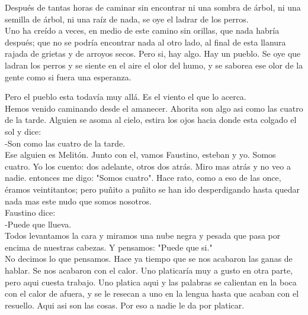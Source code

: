 \documentclass{article}
\title{}
\author{Juárez Torres Karla Romina}
\theoremstyle{mytheoremstyle}
\theoremstyle{mytheoremstyle}
\theoremstyle{myproblemstyle}
\begin{document}
\maketitle

Después de tantas horas de caminar sin encontrar ni una sombra de árbol, ni una semilla de  árbol, ni una raíz de nada, se oye el ladrar de los perros. \\

Uno ha creído a veces, en medio de este camino sin orillas, que nada habría después; que no se podría encontrar nada al otro lado, al final de esta llanura rajada de grietas y de arroyos  secos. Pero si, hay algo. Hay un pueblo. Se oye que ladran los perros y se siente en el aire el  olor del humo, y se saborea ese olor de la gente como si fuera una esperanza.

Pero el pueblo esta todavía muy allá. Es el viento el que lo acerca.\\

Hemos venido caminando desde el amanecer. Ahorita son algo asi como las cuatro de la tarde. Alguien se asoma al cielo, estira los ojos hacia donde esta colgado el sol y dice:\\

-Son como las cuatro de la tarde.\\

Ese alguien es Melitón. Junto con el, vamos Faustino, esteban y yo. Somos cuatro. Yo los  cuento: dos adelante, otros dos atrás. Miro mas atrás y no veo a nadie. entonces me digo: "Somos cuatro". Hace rato, como a eso de las once, éramos veintitantos; pero puñito a puñito se han ido desperdigando hasta quedar nada mas este nudo que somos nosotros.\\

Faustino dice:\\


-Puede que llueva.\\

Todos levantamos la cara y miramos una nube negra y pesada que pasa por encima de  nuestras cabezas. Y pensamos: "Puede que si."\\

No decimos lo que pensamos. Hace ya tiempo que se nos acabaron las ganas de hablar. Se nos acabaron con el calor. Uno platicaría muy a gusto en otra parte, pero aqui cuesta trabajo. Uno platica aqui y las palabras se calientan en la boca con el calor de afuera, y se le resecan a uno en la lengua hasta que acaban con el resuello. Aqui asi son las cosas. Por eso a nadie le  da por platicar.\\
\end{document}
